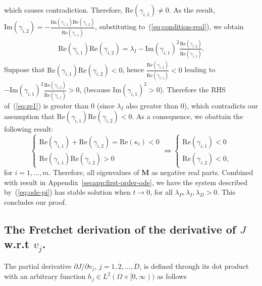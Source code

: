 which causes contradiction. Therefore, $\mathrm{Re}(\gamma_{i, 1}) \neq 0$. As the result, $\mathrm{Im}(\gamma_{i, 2}) =\displaystyle -\frac{\mathrm{Im}(\gamma_{i, 1})\mathrm{Re}(\gamma_{i, 2})}{\mathrm{Re}(\gamma_{i, 1})}$, substituting to~(\ref{eq:condition-real}), we obtain
\begin{align}
\label{eq:re1}
    \mathrm{Re}(\gamma_{i, 1})\mathrm{Re}(\gamma_{i, 2}) = \lambda_I - \mathrm{Im}(\gamma_{i, 1})^2\frac{\mathrm{Re}(\gamma_{i, 2})}{\mathrm{Re}(\gamma_{i, 1})}.
\end{align}
Suppose that $\mathrm{Re}(\gamma_{i, 1})\mathrm{Re}(\gamma_{i, 2}) < 0$, hence $\displaystyle \frac{\mathrm{Re}(\gamma_{i, 2})}{\mathrm{Re}(\gamma_{i, 1})} < 0$ leading to $\displaystyle - \mathrm{Im}(\gamma_{i, 1})^2\frac{\mathrm{Re}(\gamma_{i, 2})}{\mathrm{Re}(\gamma_{i, 1})} > 0$, (because $\mathrm{Im}(\gamma_{i, 1})^2 > 0$). Therefore the RHS of~(\ref{eq:re1}) is greater than 0 (since $\lambda_I$ also greater than $0$), which contradicts our assumption that $\mathrm{Re}(\gamma_{i, 1})\mathrm{Re}(\gamma_{i, 2}) < 0$. As a consequence, we obattain the following result:
\begin{equation}
    \begin{cases}
        \mathrm{Re}(\gamma_{i, 1}) + \mathrm{Re}(\gamma_{i, 2}) = \mathrm{Re}(\kappa_i) < 0\\
        \mathrm{Re}(\gamma_{i, 1})\mathrm{Re}(\gamma_{i, 2}) > 0
    \end{cases}
    \iff \begin{cases}
        \mathrm{Re}(\gamma_{i, 1}) < 0\\
        \mathrm{Re}(\gamma_{i, 2}) < 0,
    \end{cases}
\end{equation}
for $i = 1, \dots, m$. Therefore, all eigenvalues of $\bm{M}$ as negative real parts. Combined with result in Appendix~\ref{secapp:first-order-ode}, we have the system described by~(\ref{eq:ode-pi}) has stable solution when $t \rightarrow 0$, for all $\lambda_P, \lambda_I, \lambda_D > 0$. This concludes our proof.
\subsection{The Fretchet derivation of the derivative of $J$ w.r.t $v_j$.}
The partial derivative ${\partial J}/{\partial v_j}$, $j = 1, 2, \dots, D$, is defined through its dot product with an arbitrary function $h_j \in L^{2}(\Omega \times [0, \infty))$ as follows

